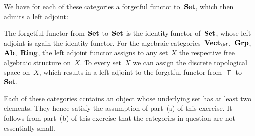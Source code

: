 We have for each of these categories a forgetful functor to~$\mathbf{Set}$, which then admits a left adjoint:

The forgetful functor from~$\mathbf{Set}$ to~$\mathbf{Set}$ is the identity functor of~$\mathbf{Set}$, whose left adjoint is again the identity functor.
For the algebraic categories~$\Vect{\kf}$,~$\mathbf{Grp}$,~$\mathbf{Ab}$,~$\mathbf{Ring}$, the left adjoint functor assigns to any set~$X$ the respective free algebraic structure on~$X$.
To every set~$X$ we can assign the discrete topological space on~$X$, which results in a left adjoint to the forgetful functor from~$\Top$ to~$\mathbf{Set}$.

Each of these categories contains an object whose underlying set has at least two elements.
They hence satisfy the assumption of part~(a) of this exercise.
It follows from part~(b) of this exercise that the categories in question are not essentially small.

